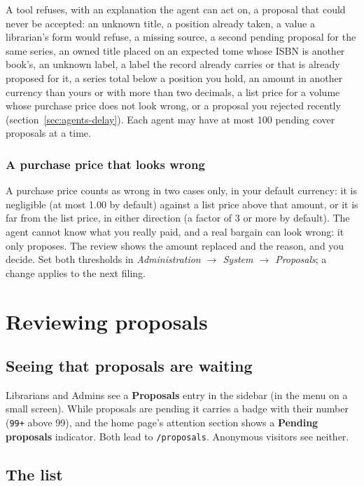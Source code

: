 A tool refuses, with an explanation the agent can act on, a proposal
that could never be accepted: an unknown title, a position already
taken, a value a librarian's form would refuse, a missing source, a
second pending proposal for the same series, an owned title placed on
an expected tome whose ISBN is another book's, an unknown label, a
label the record already carries or that is already proposed for it,
a series total below a position you hold, an amount in another
currency than yours or with more than two decimals, a list price for a
volume whose purchase price does not look wrong,
or a proposal you rejected recently (section~\ref{sec:agents-delay}). Each agent may
have at most 100 pending cover proposals at a time.

\subsubsection*{A purchase price that looks wrong}

A purchase price counts as wrong in two cases only, in your default
currency: it is negligible (at most 1.00 by default) against a list price above
that amount, or it is far from the list price, in either direction (a
factor of 3 or more by default). The agent cannot know what you really
paid, and a real bargain can look wrong: it only proposes. The review
shows the amount replaced and the reason, and you decide. Set both
thresholds in \emph{Administration \(\rightarrow\) System
\(\rightarrow\) Proposals}; a change applies to the next filing.

\section{Reviewing proposals}
\label{sec:proposals}

\subsection{Seeing that proposals are waiting}

Librarians and Admins see a \textbf{Proposals}
entry in the sidebar (in the menu on a small screen). While proposals are pending it carries a
badge with their number (\texttt{99+} above 99), and the home page's
attention section shows a \textbf{Pending proposals} indicator. Both
lead to \texttt{/proposals}. Anonymous visitors see neither.

\subsection{The list}

